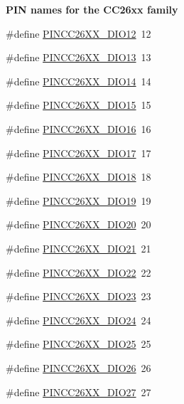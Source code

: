 \begin{Indent}{\bf P\+I\+N names for the C\+C26xx family}
\begin{DoxyCompactItemize}
\item 
\#define \hyperlink{_p_i_n_c_c26_x_x_8h_a8587d8b01ff58a9e44c69f681a8a5403}{P\+I\+N\+C\+C26\+X\+X\+\_\+\+D\+I\+O12}~12
\item 
\#define \hyperlink{_p_i_n_c_c26_x_x_8h_a9054f3638cfc519f1120c93cebcc74af}{P\+I\+N\+C\+C26\+X\+X\+\_\+\+D\+I\+O13}~13
\item 
\#define \hyperlink{_p_i_n_c_c26_x_x_8h_a5f954c43ab868ba10c1cb0b56b637069}{P\+I\+N\+C\+C26\+X\+X\+\_\+\+D\+I\+O14}~14
\item 
\#define \hyperlink{_p_i_n_c_c26_x_x_8h_ac2fa80ad26e292a57acd40aad35706cc}{P\+I\+N\+C\+C26\+X\+X\+\_\+\+D\+I\+O15}~15
\item 
\#define \hyperlink{_p_i_n_c_c26_x_x_8h_a7c33d96405c6b258fc9f64192d7d11a6}{P\+I\+N\+C\+C26\+X\+X\+\_\+\+D\+I\+O16}~16
\item 
\#define \hyperlink{_p_i_n_c_c26_x_x_8h_a8bdc44b33a921952a875b232ba90eece}{P\+I\+N\+C\+C26\+X\+X\+\_\+\+D\+I\+O17}~17
\item 
\#define \hyperlink{_p_i_n_c_c26_x_x_8h_afdc8f81dd314d58587b0b563c9bcd915}{P\+I\+N\+C\+C26\+X\+X\+\_\+\+D\+I\+O18}~18
\item 
\#define \hyperlink{_p_i_n_c_c26_x_x_8h_a3368bb8b764b71fa0317542678645fcf}{P\+I\+N\+C\+C26\+X\+X\+\_\+\+D\+I\+O19}~19
\item 
\#define \hyperlink{_p_i_n_c_c26_x_x_8h_a375944150318e9210f12e0fe82b81948}{P\+I\+N\+C\+C26\+X\+X\+\_\+\+D\+I\+O20}~20
\item 
\#define \hyperlink{_p_i_n_c_c26_x_x_8h_a93ece28a1be27fb6d8202ae4f30e2d47}{P\+I\+N\+C\+C26\+X\+X\+\_\+\+D\+I\+O21}~21
\item 
\#define \hyperlink{_p_i_n_c_c26_x_x_8h_a1d0d4bed8aa48e5b15c2408ad4099a9a}{P\+I\+N\+C\+C26\+X\+X\+\_\+\+D\+I\+O22}~22
\item 
\#define \hyperlink{_p_i_n_c_c26_x_x_8h_ae0dd08058f49a45575f9886b9f38b906}{P\+I\+N\+C\+C26\+X\+X\+\_\+\+D\+I\+O23}~23
\item 
\#define \hyperlink{_p_i_n_c_c26_x_x_8h_a06de9b0fd8670e462d81163baf7b2808}{P\+I\+N\+C\+C26\+X\+X\+\_\+\+D\+I\+O24}~24
\item 
\#define \hyperlink{_p_i_n_c_c26_x_x_8h_ab91d047da997d30fbf36c0e23dafa2af}{P\+I\+N\+C\+C26\+X\+X\+\_\+\+D\+I\+O25}~25
\item 
\#define \hyperlink{_p_i_n_c_c26_x_x_8h_a5e2ac43aec42da85be2a5e1696982c07}{P\+I\+N\+C\+C26\+X\+X\+\_\+\+D\+I\+O26}~26
\item 
\#define \hyperlink{_p_i_n_c_c26_x_x_8h_a93cb24d016cf016c185206b8e7011e32}{P\+I\+N\+C\+C26\+X\+X\+\_\+\+D\+I\+O27}~27

\end{DoxyCompactItemize}
\end{Indent}
